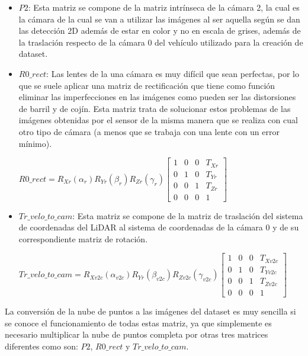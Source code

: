 \begin{itemize}
    \item $P2$: Esta matriz se compone de la matriz intrínseca de la cámara 2, la cual es la cámara de la cual se van a utilizar las imágenes al ser aquella según se dan las detección 2D además de estar en color y no en escala de grises, además de la traslación respecto de la cámara 0 del vehículo utilizado para la creación de dataset.
    \item $R0\_rect$: Las lentes de la una cámara es muy difícil que sean perfectas, por lo que se suele aplicar una matriz de rectificación que tiene como función eliminar las imperfecciones en las imágenes como pueden ser las distorsiones de barril y de cojín. Esta matriz trata de solucionar estos problemas de las imágenes obtenidas por el sensor de la misma manera que se realiza con cual otro tipo de cámara (a menos que se trabaja con una lente con un error mínimo).
    \begin{center}
    $
    \textit{R0\_rect} = R_{Xr}(\alpha_r) R_{Yr}(\beta_r) R_{Zr}(\gamma_r) 
    \begin{bmatrix} 1&0&0&T_{Xr} \\ 0&1&0&T_{Yr} \\ 0&0&1&T_{Zr} \\ 0&0&0&1 \end{bmatrix}
    $
    \end{center}
    \item $Tr\_velo\_to\_cam$: Esta matriz se compone de la matriz de traslación del sistema de coordenadas del \ac{LiDAR} al sistema de coordenadas de la cámara 0 y de su correspondiente matriz de rotación.
    \begin{center}
    $
    \textit{Tr\_velo\_to\_cam} = R_{X\textit{v2c}}(\alpha_\textit{v2c}) R_{Yr}(\beta_\textit{v2c}) R_{Z\textit{v2c}}(\gamma_\textit{v2c}) 
    \begin{bmatrix} 1&0&0&T_{X\textit{v2c}} \\ 0&1&0&T_{Y\textit{v2c}} \\ 0&0&1&T_{Z\textit{v2c}} \\ 0&0&0&1 \end{bmatrix}
    $
    \end{center}
\end{itemize}

La conversión de la nube de puntos a las imágenes del dataset es muy sencilla si se conoce el funcionamiento de todas estas matriz, ya que simplemente es necesario multiplicar la nube de puntos completa por otras tres matrices diferentes como son: $P2$, $R0\_rect$ y $Tr\_velo\_to\_cam$.

